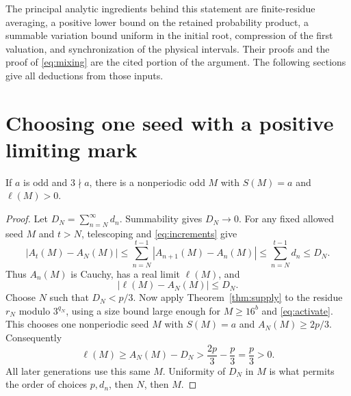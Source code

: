 The principal analytic ingredients behind this statement are finite-residue
averaging, a positive lower bound on the retained probability product,
a summable variation bound uniform in the initial root, compression of
the first valuation, and synchronization of the physical intervals.
Their proofs and the proof of \eqref{eq:mixing} are the cited portion of
the argument. The following sections give all deductions from those inputs.

\section{Choosing one seed with a positive limiting mark}
\begin{lemma}\label{lem:limit}
If $a$ is odd and $3\nmid a$, there is a nonperiodic odd $M$ with
$S(M)=a$ and $\ell(M)>0$.
\end{lemma}
\begin{proof}
Let $D_N=\sum_{n=N}^{\infty}d_n$. Summability gives $D_N\to0$.
For any fixed allowed seed $M$ and $t>N$, telescoping and
\eqref{eq:increments} give
\[
 |A_t(M)-A_N(M)|
 \le\sum_{n=N}^{t-1}|A_{n+1}(M)-A_n(M)|
 \le\sum_{n=N}^{t-1}d_n\le D_N.
\]
Thus $A_n(M)$ is Cauchy, has a real limit $\ell(M)$, and
\begin{equation}\label{eq:tail}
 |\ell(M)-A_N(M)|\le D_N.
\end{equation}
Choose $N$ such that $D_N<p/3$. Now apply
Theorem~\ref{thm:supply} to the residue $r_N$ modulo $3^{q_N}$, using
a size bound large enough for $M\ge16^b$ and \eqref{eq:activate}.
This chooses one nonperiodic seed $M$ with $S(M)=a$ and
$A_N(M)\ge2p/3$. Consequently
\[
 \ell(M)\ge A_N(M)-D_N>\frac{2p}{3}-\frac p3=\frac p3>0.
\]
All later generations use this same $M$. Uniformity of $D_N$ in $M$
is what permits the order of choices $p,d_n$, then $N$, then $M$.
\end{proof}

